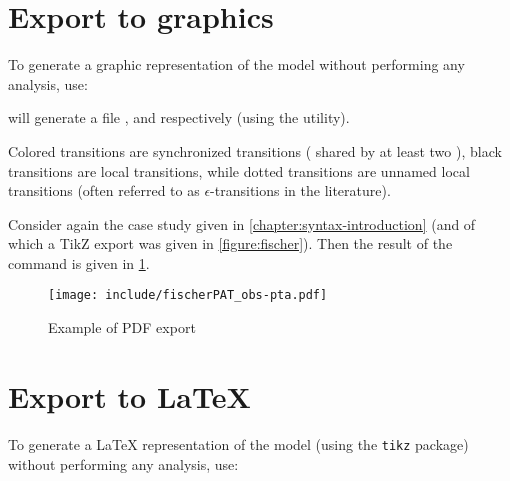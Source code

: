 

\section{Export to graphics}

To generate a graphic representation of the \NIPTA{} model without performing any analysis, use:




\imitator{} will generate a file ,  and  respectively (using the \gdot{} utility).

Colored transitions are synchronized transitions (\ie{} shared by at least two \IPTA{}), black transitions are local transitions, while dotted transitions are unnamed local transitions (often referred to as $\epsilon$-transitions in the literature).

\begin{example}
	Consider again the case study given in \cref{chapter:syntax-introduction} (and of which a TikZ export was given in \cref{figure:fischer}).
	Then the result of the  command is given in \cref{figure:PDF-export}.
\end{example}

\begin{figure}
	\texttt{[image: include/fischerPAT\_obs-pta.pdf]}

	\caption{Example of PDF export}
	\label{figure:PDF-export}
\end{figure}




\section{Export to \LaTeX{}}

To generate a \LaTeX{} representation of the \NIPTA{} model (using the \texttt{tikz} package) without performing any analysis, use:


